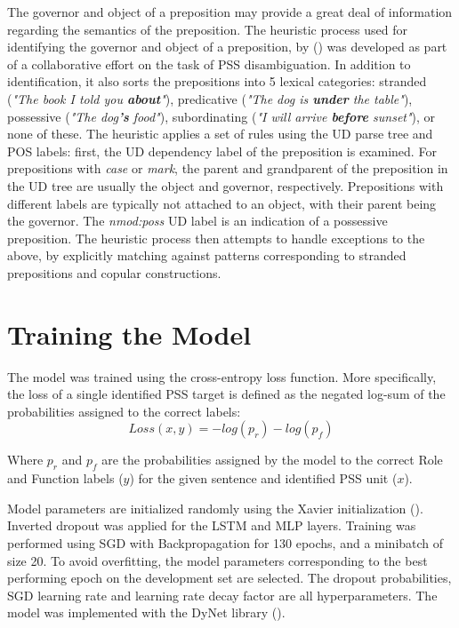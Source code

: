 The governor and object of a preposition may provide a great deal of information regarding the semantics of the preposition. The heuristic process used for identifying the governor and object of a preposition, by (\cite{snacs}) was developed as part of a collaborative effort on the task of PSS disambiguation. In addition to identification, it also sorts the prepositions into 5 lexical categories: stranded (\emph{"The book I told you \textbf{about}"}), predicative (\emph{"The dog is \textbf{under} the table"}), possessive (\emph{"The dog\textbf{'s} food"}), subordinating (\emph{"I will arrive \textbf{before} sunset"}), or none of these. The heuristic applies a set of rules using the UD parse tree and POS labels: first, the UD dependency label of the preposition is examined. For prepositions with \emph{case} or \emph{mark}, the parent and grandparent of the preposition in the UD tree are usually the object and governor, respectively. Prepositions with different labels are typically not attached to an object, with their parent being the governor.  The \emph{nmod:poss} UD label is an indication of a possessive preposition. The heuristic process then attempts to handle exceptions to the above, by explicitly matching against patterns corresponding to stranded prepositions and copular constructions.  
\section{Training the Model} \label{sec:psstraining}

The model was trained using the cross-entropy loss function. More specifically, the loss of a single identified PSS target is defined as the negated log-sum of the probabilities assigned to the correct labels: 
$$ Loss(x, y) = - log(p_r) - log(p_f) $$

Where $p_r$ and $p_f$ are the probabilities assigned by the model to the correct Role and Function labels ($y$) for the given sentence and identified PSS unit ($x$).

Model parameters are initialized randomly using the Xavier initialization (\cite{glorot10xavier}). Inverted dropout was applied for the LSTM and MLP layers. Training was performed using SGD with Backpropagation for 130 epochs, and a minibatch of size 20. To avoid overfitting, the model parameters corresponding to the best performing epoch on the development set are selected. The dropout probabilities, SGD learning rate and learning rate decay factor are all hyperparameters. The model was implemented with the DyNet library (\cite{dynet}).

